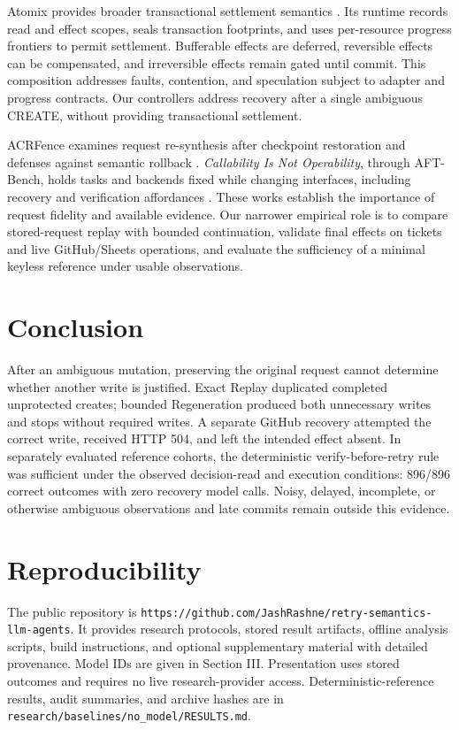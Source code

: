 \documentclass[conference]{IEEEtran}
\newcommand{\codeurl}[1]{{\def\UrlFont{\ttfamily}\nolinkurl{#1}}}
\begin{document}
Atomix provides broader transactional settlement semantics \cite{atomix}. Its runtime records read and effect scopes, seals transaction footprints, and uses per-resource progress frontiers to permit settlement. Bufferable effects are deferred, reversible effects can be compensated, and irreversible effects remain gated until commit. This composition addresses faults, contention, and speculation subject to adapter and progress contracts. Our controllers address recovery after a single ambiguous CREATE, without providing transactional settlement.


ACRFence examines request re-synthesis after checkpoint restoration and defenses against semantic rollback \cite{acrfence}. \emph{Callability Is Not Operability}, through AFT-Bench, holds tasks and backends fixed while changing interfaces, including recovery and verification affordances \cite{aft}. These works establish the importance of request fidelity and available evidence. Our narrower empirical role is to compare stored-request replay with bounded continuation, validate final effects on tickets and live GitHub/Sheets operations, and evaluate the sufficiency of a minimal keyless reference under usable observations.


\section{Conclusion}

After an ambiguous mutation, preserving the original request cannot determine whether another write is justified. Exact Replay duplicated completed unprotected creates; bounded Regeneration produced both unnecessary writes and stops without required writes. A separate GitHub recovery attempted the correct write, received HTTP 504, and left the intended effect absent. In separately evaluated reference cohorts, the deterministic verify-before-retry rule was sufficient under the observed decision-read and execution conditions: 896/896 correct outcomes with zero recovery model calls. Noisy, delayed, incomplete, or otherwise ambiguous observations and late commits remain outside this evidence.


\section{Reproducibility}

{\raggedright The public repository is \codeurl{https://github.com/JashRashne/retry-semantics-llm-agents}. It provides research protocols, stored result artifacts, offline analysis scripts, build instructions, and optional supplementary material with detailed provenance. Model IDs are given in Section III. Presentation uses stored outcomes and requires no live research-provider access. Deterministic-reference results, audit summaries, and archive hashes are in \codeurl{research/baselines/no_model/RESULTS.md}.\par}
\end{document}
